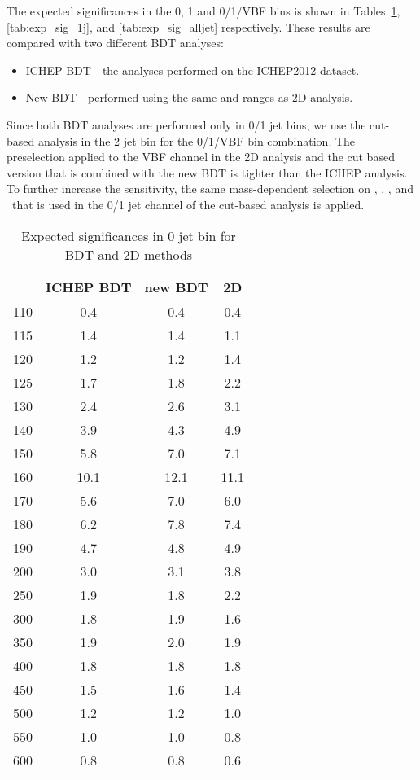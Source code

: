 
The expected significances in the 0, 1 and 0/1/VBF bins
is shown in Tables~\ref{tab:exp_sig_0j}, \ref{tab:exp_sig_1j}, 
and \ref{tab:exp_sig_alljet} respectively.
These results are compared with two different BDT analyses:

\begin{itemize}
    \item ICHEP BDT - the analyses performed on the ICHEP2012 dataset.
    \item New BDT - performed using the same \mt and \mll ranges as 2D analysis.
\end{itemize}

Since both BDT analyses are performed only in 0/1 jet bins, 
we use the cut-based analysis in the 2 jet bin for the 0/1/VBF bin combination. 
The preselection applied to the VBF channel in the 2D analysis
and the cut based version that is combined with the new BDT
is tighter than the ICHEP analysis.
To further increase the sensitivity, the
same mass-dependent selection on \ptlmax, \ptlmin, \mll, 
and \delphill~that is used in the 0/1 jet channel of the cut-based analysis
is applied.

\begin{table}[!htb] 
	\centering
	\begin{tabular}{c | c c c  }
   	\hline \hline
	\mHi & ICHEP BDT & new BDT & 2D \\
	\hline
	110	&0.4	&0.4	&0.4 	\\
	115	&1.4	&1.4	&1.1 	\\
	120	&1.2	&1.2	&1.4 	\\
	125	&1.7	&1.8	&2.2 	\\
	130	&2.4	&2.6	&3.1 	\\
	140	&3.9	&4.3	&4.9 	\\
	150	&5.8	&7.0	&7.1	\\
	160	&10.1	&12.1	&11.1 	\\
	170	&5.6	&7.0	&6.0 	\\	
	180	&6.2	&7.8	&7.4    \\ 
	190	&4.7	&4.8	&4.9    \\
	200	&3.0	&3.1	&3.8    \\
	250	&1.9	&1.8	&2.2    \\
	300	&1.8	&1.9	&1.6    \\
	350	&1.9	&2.0	&1.9    \\
	400	&1.8	&1.8	&1.8    \\
	450	&1.5	&1.6	&1.4    \\
	500	&1.2	&1.2	&1.0    \\
	550	&1.0	&1.0	&0.8    \\
	600	&0.8	&0.8	&0.6    \\
   	\hline \hline
	\end{tabular}
	\label{tab:exp_sig_0j}
	\caption{Expected significances in 0 jet bin for BDT and 2D methods}
\end{table}

